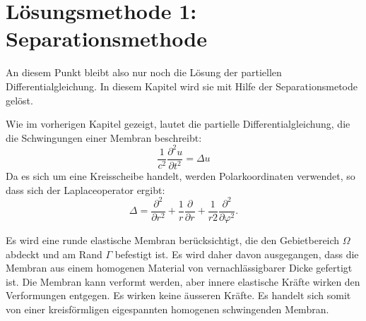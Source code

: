 %
%


\section{Lösungsmethode 1: Separationsmethode 
	\label{kreismembran:section:teil1}}
An diesem Punkt bleibt also nur noch die Lösung der partiellen Differentialgleichung. In diesem Kapitel wird sie mit Hilfe der Separationsmetode gelöst.

Wie im vorherigen Kapitel gezeigt, lautet die partielle Differentialgleichung, die die Schwingungen einer Membran beschreibt:
\begin{equation*}
	\frac{1}{c^2}\frac{\partial^2u}{\partial t^2} = \Delta u
\end{equation*}
Da es sich um eine Kreisscheibe handelt, werden Polarkoordinaten verwendet, so dass sich der Laplaceoperator ergibt:
\begin{equation*}
	\Delta
	=
	\frac{\partial^2}{\partial r^2}
	+
	\frac1r
	\frac{\partial}{\partial r}
	+
	\frac{1}{r 2}
	\frac{\partial^2}{\partial\varphi^2}.
	\label{buch:pde:kreis:laplace}
\end{equation*}

Es wird eine runde elastische Membran berücksichtigt, die den Gebietbereich $\Omega$ abdeckt und am Rand $\Gamma$ befestigt ist.
Es wird daher davon ausgegangen, dass die Membran aus einem homogenen Material von vernachlässigbarer Dicke gefertigt ist.
Die Membran kann verformt werden, aber innere elastische Kräfte wirken den Verformungen entgegen. Es wirken keine äusseren Kräfte. Es handelt sich somit von einer kreisförmligen eigespannten homogenen schwingenden Membran.

